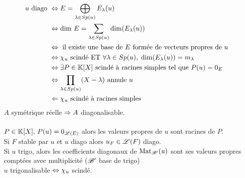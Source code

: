 \documentclass[12 pt]{exampleclass}
\begin{document}
\begin{equation*}
\begin{aligned}
u \text{ diago } & \Leftrightarrow E = \bigoplus_{\lambda \in Sp(u)} E_\lambda(u)\\
& \Leftrightarrow \text{dim } E = \sum_{\lambda\in Sp(u)} \text{dim}(E_\lambda(u))\\
&\Leftrightarrow \text{ il existe une base de $E$ formée de vecteurs propres de $u$}\\
& \Leftrightarrow \chi_u \text{ scindé ET } \forall \lambda \in Sp(u), \; \text{dim}(E_\lambda(u)) = m_\lambda\\
&\Leftrightarrow \exists P\in\mathbb{K}[X] \text{ scindé à racines simples tel que } P(u) = 0_E\\
&\Leftrightarrow \prod_{\lambda \in Sp(u)} (X-\lambda)\text{ annule } u\\
&\Leftarrow \chi_u \text{ scindé à racines simples}\\
\end{aligned}
\end{equation*}
$A$ symétrique réelle $\Rightarrow A$ diagonalisable.\\
\text{}\\
$P\in \mathbb{K}[X], \, P(u) = 0_{\mathscr{L}(E)}$ alors les valeurs propres de $u$ sont racines de $P$.\\
Si $F$ stable par $u$ et $u$ diago alors $u_F\in \mathscr{L}(F)$ diago.\\
Si $u$ trigo, alors les coefficients diagonaux de $\text{Mat}_{\mathscr{B}'}(u)$ sont ses valeurs propres comptées avec multiplicité ($\mathscr{B}'$ base de trigo)\\
$u$ trigonalisable $\Leftrightarrow \chi_u$ scindé.\\
\end{document}

